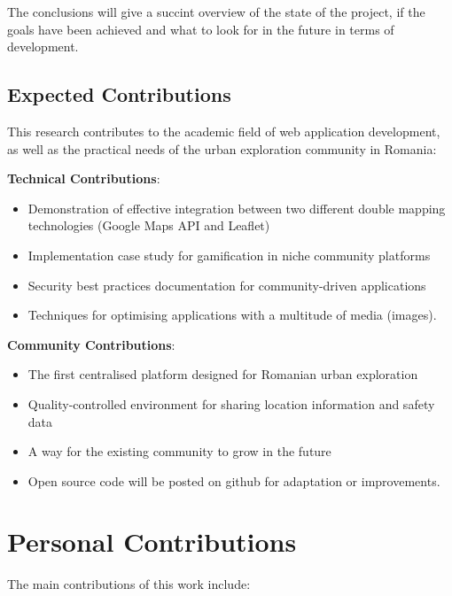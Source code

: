 \documentclass[12pt,a4paper]{report}
\begin{document}
The conclusions will give a succint overview of the state of the project, if the goals have been achieved and what to look for in the future in terms of development.

\section*{Expected Contributions}

This research contributes to the academic field of web application development, as well as the practical needs of the urban exploration community in Romania:

\textbf{Technical Contributions}:
\begin{itemize}
    \item Demonstration of effective integration between two different double mapping technologies (Google Maps API and Leaflet)
    \item Implementation case study for gamification in niche community platforms
    \item Security best practices documentation for community-driven applications
    \item Techniques for optimising applications with a multitude of media (images).
\end{itemize}

\textbf{Community Contributions}:
\begin{itemize}
    \item The first centralised platform designed for Romanian urban exploration
    \item Quality-controlled environment for sharing location information and safety data
    \item A way for the existing community to grow in the future
    \item Open source code will be posted on github for adaptation or improvements.
\end{itemize}

\newpage

\chapter*{Personal Contributions}

The main contributions of this work include:
\end{document}
